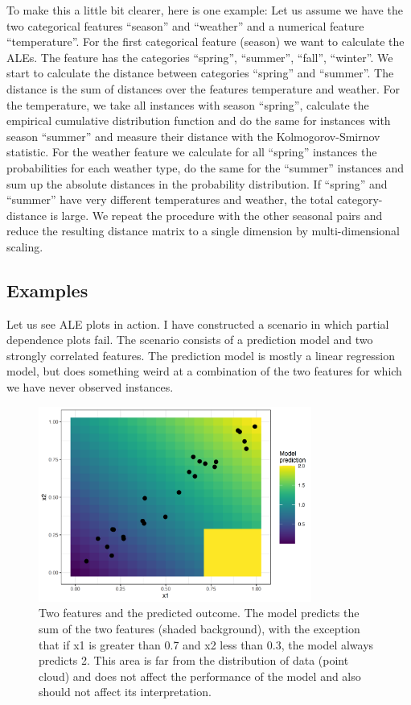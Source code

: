 \documentclass[
  10pt,
]{scrbook}
\begin{document}
To make this a little bit clearer, here is one example:
Let us assume we have the two categorical features ``season'' and ``weather'' and a numerical feature ``temperature''.
For the first categorical feature (season) we want to calculate the ALEs.
The feature has the categories ``spring'', ``summer'', ``fall'', ``winter''.
We start to calculate the distance between categories ``spring'' and ``summer''.
The distance is the sum of distances over the features temperature and weather.
For the temperature, we take all instances with season ``spring'', calculate the empirical cumulative distribution function and do the same for instances with season ``summer'' and measure their distance with the Kolmogorov-Smirnov statistic.
For the weather feature we calculate for all ``spring'' instances the probabilities for each weather type, do the same for the ``summer'' instances and sum up the absolute distances in the probability distribution.
If ``spring'' and ``summer'' have very different temperatures and weather, the total category-distance is large.
We repeat the procedure with the other seasonal pairs and reduce the resulting distance matrix to a single dimension by multi-dimensional scaling.

\hypertarget{examples-1}{%
\subsection{Examples}\label{examples-1}}

Let us see ALE plots in action.
I have constructed a scenario in which partial dependence plots fail.
The scenario consists of a prediction model and two strongly correlated features.
The prediction model is mostly a linear regression model, but does something weird at a combination of the two features for which we have never observed instances.

\begin{figure}

{\centering \includegraphics[width=0.8\textwidth]{images/correlation-problem-1} 

}

\caption{Two features and the predicted outcome. The model predicts the sum of the two features (shaded background), with the exception that if x1 is greater than 0.7 and x2 less than 0.3, the model always predicts 2. This area is far from the distribution of data (point cloud) and does not affect the performance of the model and also should not affect its interpretation.}\label{fig:correlation-problem}
\end{figure}
\end{document}
